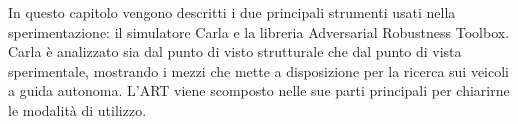 In questo capitolo vengono descritti i due principali strumenti usati nella sperimentazione: il simulatore Carla e la libreria Adversarial Robustness Toolbox.
Carla  è analizzato sia dal punto di visto strutturale che dal punto di vista sperimentale, mostrando i mezzi che mette a disposizione per la ricerca sui veicoli a
guida autonoma. L'ART viene scomposto nelle sue parti principali per chiarirne le modalità di utilizzo.



